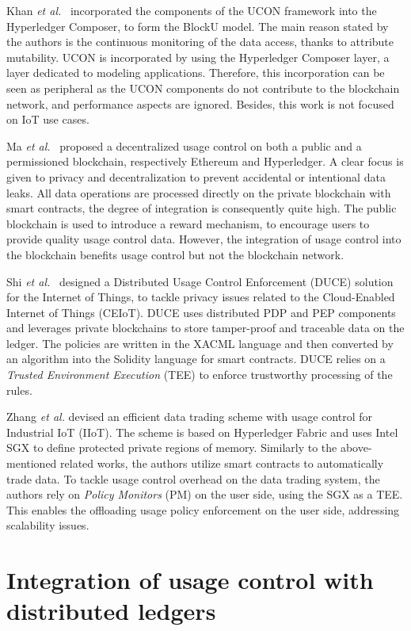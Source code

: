 Khan \emph{et al.}~\cite{Khan2020} incorporated the components of the UCON framework into the Hyperledger Composer, to form the BlockU model. The main reason stated by the authors is the continuous monitoring of the data access, thanks to attribute mutability. UCON is incorporated by using the Hyperledger Composer layer, a layer dedicated to modeling applications. Therefore, this incorporation can be seen as peripheral as the UCON components do not contribute to the blockchain network, and performance aspects are ignored. Besides, this work is not focused on IoT use cases.

Ma \emph{et al.}~\cite{Ma2020} proposed a decentralized usage control on both a public and a permissioned blockchain, respectively Ethereum and Hyperledger. A clear focus is given to privacy and decentralization to prevent accidental or intentional data leaks. All data operations are processed directly on the private blockchain with smart contracts, the degree of integration is consequently quite high. The public blockchain is used to introduce a reward mechanism, to encourage users to provide quality usage control data. However, the integration of usage control into the blockchain benefits usage control but not the blockchain network.

Shi \emph{et al.}~\cite{Shi2021} designed a Distributed Usage Control Enforcement (DUCE) solution for the Internet of Things, to tackle privacy issues related to the Cloud-Enabled Internet of Things (CEIoT). DUCE uses distributed PDP and PEP components and leverages private blockchains to store tamper-proof and traceable data on the ledger. The policies are written in the XACML language and then converted by an algorithm into the Solidity language for smart contracts. DUCE relies on a \emph{Trusted Environment Execution} (TEE) to enforce trustworthy processing of the rules.

Zhang \emph{et al.} \cite{Zhang2022} devised an efficient data trading scheme with usage control for Industrial IoT (IIoT). The scheme is based on Hyperledger Fabric and uses Intel SGX to define protected private regions of memory. Similarly to the above-mentioned related works, the authors utilize smart contracts to automatically trade data. To tackle usage control overhead on the data trading system, the authors rely on \emph{Policy Monitors} (PM) on the user side, using the SGX as a TEE. This enables the offloading usage policy enforcement on the user side, addressing scalability issues.

\section{Integration of usage control with distributed ledgers}
\label{S_integration_usage_control_with_dlt}


